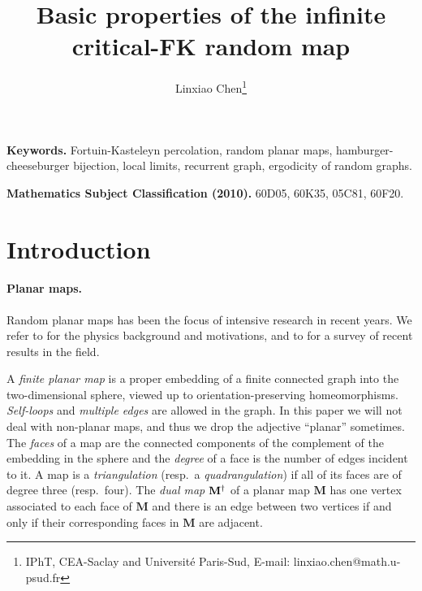 \documentclass[a4paper]{article}
\title{Basic properties of the infinite critical-FK random map}
\author{Linxiao Chen\thanks{IPhT, CEA-Saclay and Universit\'e Paris-Sud, E-mail: linxiao.chen@math.u-psud.fr}}
\date{}
\newcommand*{\map}{\mathbf}
\newcommand*{\m}{\map{M}}
\begin{document}
\maketitle



\bigskip\noindent
\textbf{Keywords.} Fortuin-Kasteleyn percolation, random planar maps, hamburger-cheeseburger bijection, local limits, recurrent graph, ergodicity of random graphs.

\medskip\noindent
\textbf{Mathematics Subject Classification (2010).}
60D05, %
60K35, %
05C81, %
60F20. %

\section{Introduction}

\paragraph{Planar maps.}
Random planar maps has been the focus of intensive research in recent
years.  We refer to \cite{ADJ97} for the physics background and
motivations, and to \cite{StFlour14} for a survey of recent
results in the field.

A \emph{finite planar map} is a proper embedding of a finite connected graph into the two-dimensional sphere, viewed up to orientation-preserving homeomorphisms.
\emph{Self-loops} and \emph{multiple edges} are allowed in the graph.
In this paper we will not deal with non-planar maps, and thus we drop the adjective ``planar'' sometimes.
The \emph{faces} of a map are the connected components of the complement of the embedding in the sphere and the \emph{degree} of a face is the number of edges incident to it.
A map is a \emph{triangulation} (resp.~a \emph{quadrangulation}) if all of its faces are of degree three (resp.~four).
The \emph{dual map} $\m^\dual$ of a planar map $\map{M}$ has one vertex associated to each face of $\map{M}$ and there is an edge between two vertices if and only if their corresponding faces in $\map{M}$ are adjacent.
\end{document}
